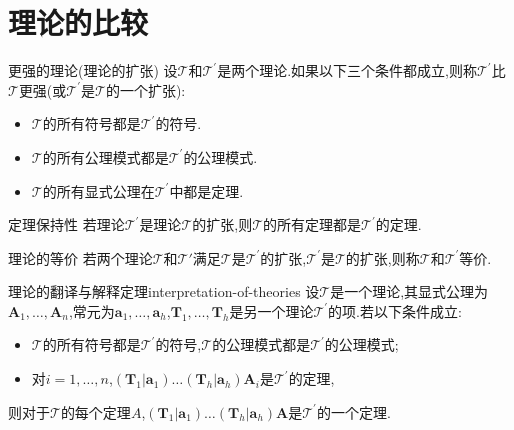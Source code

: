 \section{理论的比较}

\begin{definition}{更强的理论(理论的扩张)}{}
	设$\mathcal{T}$和$\mathcal{T}^{\prime}$是两个理论.如果以下三个条件都成立,则称$\mathcal{T}^{\prime}$比$\mathcal{T}$更强(或$\mathcal{T}^{\prime}$是$\mathcal{T}$的一个扩张):
	\begin{itemize}
		\item $\mathcal{T}$的所有符号都是$\mathcal{T}^{\prime}$的符号.
		\item $\mathcal{T}$的所有公理模式都是$\mathcal{T}^{\prime}$的公理模式.
		\item $\mathcal{T}$的所有显式公理在$\mathcal{T}^{\prime}$中都是定理.
	\end{itemize}
\end{definition}

\begin{metatheorem}{定理保持性}{}
	若理论$\mathcal{T}^{\prime}$是理论$\mathcal{T}$的扩张,则$\mathcal{T}$的所有定理都是$\mathcal{T}^{\prime}$的定理.
\end{metatheorem}

\begin{definition}{理论的等价}{}
	若两个理论$\mathcal{T}$和$\mathcal{T}'$满足$\mathcal{T}$是$\mathcal{T}^{\prime}$的扩张,$\mathcal{T}^{\prime}$是$\mathcal{T}$的扩张,则称$\mathcal{T}$和$\mathcal{T}^{\prime}$等价.
\end{definition}

\begin{metatheorem}{理论的翻译与解释定理}{interpretation-of-theories}
	设$\mathcal{T}$是一个理论,其显式公理为$\boldsymbol{A}_{1},\ldots,\boldsymbol{A}_{n}$,常元为$\boldsymbol{a}_{1},\ldots,\boldsymbol{a}_{h}$,$\boldsymbol{T}_{1},\ldots,\boldsymbol{T}_{h}$是另一个理论$\mathcal{T}^{\prime}$的项.若以下条件成立:
	\begin{itemize}
		\item $\mathcal{T}$的所有符号都是$\mathcal{T}^{\prime}$的符号,$\mathcal{T}$的公理模式都是$\mathcal{T}^{\prime}$的公理模式;
		\item 对$i=1,\ldots,n$,$\left(\boldsymbol{T}_{1}|\boldsymbol{a}_{1}\right)\ldots\left(\boldsymbol{T}_{h}|\boldsymbol{a}_{h}\right)\boldsymbol{A}_{i}$是$\mathcal{T}^{\prime}$的定理,
	\end{itemize}
	则对于$\mathcal{T}$的每个定理$A$,$\left(\boldsymbol{T}_{1}|\boldsymbol{a}_{1}\right)\ldots\left(\boldsymbol{T}_{h}|\boldsymbol{a}_{h}\right)\boldsymbol{A}$是$\mathcal{T}^{\prime}$的一个定理.
\end{metatheorem}

